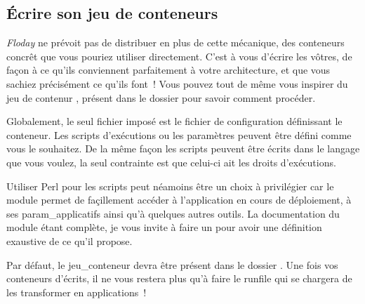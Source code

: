 \subsection{Écrire son jeu de conteneurs}

\emph{Floday} ne prévoit pas de distribuer en plus de cette mécanique, des conteneurs concrêt que vous pouriez utiliser directement.
C'est à vous d'écrire les vôtres, de façon à ce qu'ils conviennent parfaitement à votre architecture, et que vous sachiez précisément ce qu'ils font~!
Vous pouvez tout de même vous inspirer du jeu de contenur , présent dans le dossier  pour savoir comment procéder.

Globalement, le seul fichier imposé est le fichier de configuration définissant le conteneur.
Les scripts d'exécutions ou les paramètres peuvent être défini comme vous le souhaitez.
De la même façon les scripts peuvent être écrits dans le langage que vous voulez, la seul contrainte est que celui-ci ait les droits d'exécutions.

Utiliser Perl pour les scripts peut néamoins être un choix à privilégier car le module  permet de façillement accéder à l'\gls{application} en cours de déploiement, à ses \gls{param_applicatifs} ainsi qu'à quelques autres outils.
La documentation du module étant complète, je vous invite à faire un  pour avoir une définition exaustive de ce qu'il propose.

Par défaut, le \gls{jeu_conteneur} devra être présent dans le dossier .
Une fois vos conteneurs d'écrits, il ne vous restera plus qu'à faire le \gls{runfile} qui se chargera de les transformer en applications~!

